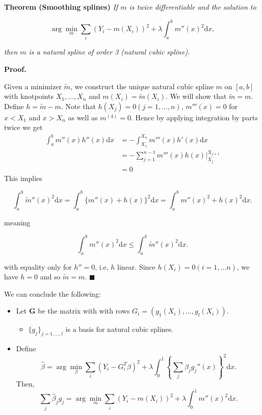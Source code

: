 \documentclass[
]{book}
\providecommand{\tightlist}{%
  \setlength{\itemsep}{0pt}\setlength{\parskip}{0pt}}
\begin{document}
\textbf{Theorem (Smoothing splines)} \emph{If \(m\) is twice differentiable and the solution to }

\[
\arg\min_{m} \sum_i (Y_i-m(X_i))^2+\lambda\int_a^b m''(x)^2\mathrm dx,
\]

\emph{then \(m\) is a natural spline of order 3 (natural cubic spline).}

\textbf{Proof.}

Given a minimizer \(\tilde m\), we construct the unique natural cubic spline \(m\) on \([a,b]\) with knotpoints \(X_1,\dots, X_n\) and \(m(X_i)=\tilde m(X_i)\). We will show that \(\tilde m=m\). Define \(h=\tilde m-m\). Note that \(h(X_j)=0 (j=1,\dots,n)\), \(m'''(x)=0\) for \(x<X_1\) and \(x>X_n\) as well as \(m^{(4)}=0\). Hence by applying integration by parts twice we get
\begin{align*}
\int_a^b m''(x)h''(x)\mathrm dx
&= -\int_{X_1}^{X_n}m'''(x)h'(x)\mathrm dx \\
&= -\sum_{j=1}^{n-1}m'''(x)h(x)\Big|_{X_j}^{X_{j+1}} \\
&=0
\end{align*}
This implies

\[
\int_a^b \tilde m''(x)^2\mathrm dx= \int_a^b \{m''(x)+h(x)\}^2\mathrm dx=\int_a^b m''(x)^2+h(x)^2\mathrm dx.
\]

meaning

\[
\int_a^b m''(x)^2\mathrm dx \leq \int_a^b \tilde m''(x)^2\mathrm dx.
\]

with equality only for \(h''=0\), i.e, \(h\) linear. Since \(h(X_i)=0 (i=1,\dots n)\), we have \(h=0\) and so \(\tilde m=m\). \(\blacksquare\)

We can conclude the following:

\begin{itemize}
\tightlist
\item
  Let \(\mathbf G\) be the matrix with with rows \(G_i=(g_1(X_i), \dots, g_l(X_i))\).

  \begin{itemize}
  \tightlist
  \item
    \(\{g_j\}_{j=1,\dots,l}\) is a basis for natural cubic splines.
  \end{itemize}
\item
  Define
  \[
    \hat \beta  = \arg\min_{\beta} \sum_i (Y_i- G_i^T\beta)^2+\lambda\int_0^1 \left\{{\sum_j \beta_jg_j''}(x)\right\}^2\mathrm dx.
    \]
  Then,
  \[
    \sum_j \hat \beta_j g_j=\arg\min_{m} \sum_i (Y_i-m(X_i))^2+\lambda\int_0^1 m''(x)^2\mathrm dx.
    \]
\end{itemize}
\end{document}

